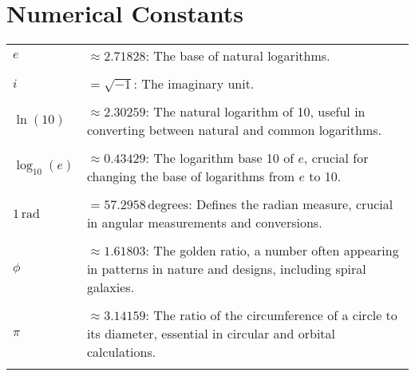 \documentclass[main.tex]{subfiles}
\begin{document}
\section*{Numerical Constants}
\begin{longtable}{p{} p{}}
    $e$ & $\approx 2.71828$: The base of natural logarithms. \\\\
    $i$ & $= \sqrt{-1}$: The imaginary unit. \\\\
    $\ln(10)$ & $\approx 2.30259$: The natural logarithm of 10, useful in converting between natural and common logarithms. \\\\
    $\log_{10}(e)$ & $\approx 0.43429$: The logarithm base 10 of \(e\), crucial for changing the base of logarithms from \(e\) to 10. \\\\
    $1\,\text{rad}$ & $= 57.2958\,\text{degrees}$: Defines the radian measure, crucial in angular measurements and conversions. \\\\
    $\phi$ & $\approx 1.61803$: The golden ratio, a number often appearing in patterns in nature and designs, including spiral galaxies. \\\\
    $\pi$ & $\approx 3.14159$: The ratio of the circumference of a circle to its diameter, essential in circular and orbital calculations. \\\\
\end{longtable}
\end{document}
